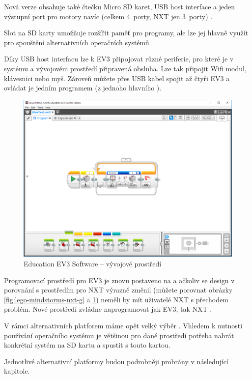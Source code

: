 
Nová verze obsahuje také čtečku Micro SD karet, USB host interface a jeden výstupní port pro motory navíc (celkem 4~porty, NXT jen 3~porty) \cite{legoBotBench_comparing-EV3-and-NXT}. 

Slot na SD karty umožňuje rozšířit paměť pro programy, ale lze jej hlavně využít pro spouštění alternativních operačních systémů. 

Díky USB host interfacu lze k EV3 připojovat různé periferie, pro které je v systému a vývojovém prostředí připravená obsluha.
Lze tak připojit Wifi modul, klávesnici nebo myš. 
Zároveň můžete přes USB kabel spojit až čtyři EV3  a ovládat je jedním programem (z jednoho hlavního ).

\begin{figure}[h]
	\centering
	\includegraphics[width=\textwidth]{images/lego-mindstorms-ev3_dev-soft.png}
	\caption[\legoM{ }Education EV3 Software -- vývojové prostředí]{\legoM{ }Education EV3 Software -- vývojové prostředí}
	\label{fig:lego-mindstorms-ev3_dev-soft}
\end{figure}

Programovací prostředí pro EV3 je znovu postaveno na \labview{ }a ačkoliv se design v porovnání s prostředím pro NXT výrazně změnil (můžete porovnat obrázky \ref{fig:lego-mindstorms-nxt-g} a \ref{fig:lego-mindstorms-ev3_dev-soft}) neměli by mít uživatelé NXT s přechodem problém. 
Nové prostředí zvládne naprogramovat jak EV3, tak NXT \brick{}.

V rámci alternativních platforem máme opět velký výběr \cite{legoMindstormsWikipedia_programming-languages}. 
Vhledem k nutnosti používání operačního systému je většinou pro dané prostředí potřeba nahrát konkrétní systém na SD kartu a spustit \brick{ }s touto kartou.

Jednotlivé alternativní platformy budou podrobněji probrány v následující kapitole.
